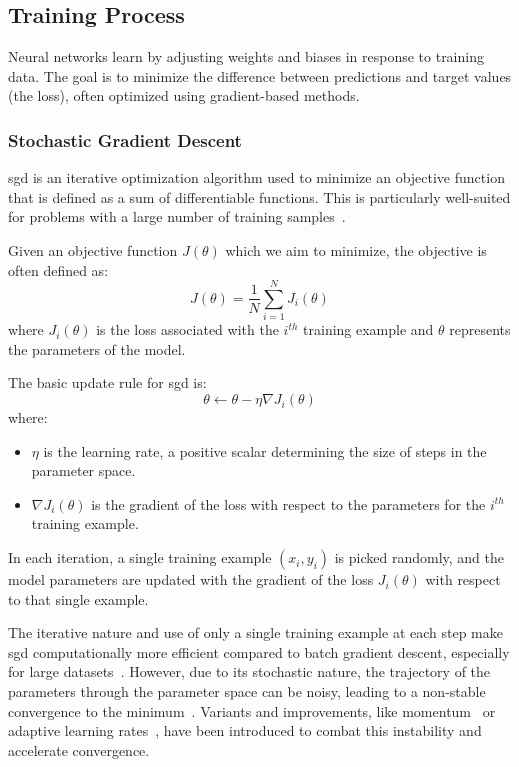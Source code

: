 \subsection{Training Process}

Neural networks learn by adjusting weights and biases in response to training data. The goal is to minimize the difference between predictions and target values (the loss), often optimized using gradient-based methods.

\subsubsection{Stochastic Gradient Descent}

\gls{sgd} is an iterative optimization algorithm used to minimize an objective function that is defined as a sum of differentiable functions. This is particularly well-suited for problems with a large number of training samples~\cite{bottou2010large}.

Given an objective function \( J(\theta) \) which we aim to minimize, the objective is often defined as:
\[
J(\theta) = \frac{1}{N} \sum_{i=1}^{N} J_i(\theta)
\]
where \( J_i(\theta) \) is the loss associated with the \( i^{th} \) training example and \( \theta \) represents the parameters of the model.

The basic update rule for \gls{sgd} is:
\[
\theta \leftarrow \theta - \eta \nabla J_i(\theta)
\]
where:
\begin{itemize}
	\item \( \eta \) is the learning rate, a positive scalar determining the size of steps in the parameter space.
	\item \( \nabla J_i(\theta) \) is the gradient of the loss with respect to the parameters for the \( i^{th} \) training example.
\end{itemize}

In each iteration, a single training example \( (x_i, y_i) \) is picked randomly, and the model parameters are updated with the gradient of the loss \( J_i(\theta) \) with respect to that single example.

The iterative nature and use of only a single training example at each step make \gls{sgd} computationally more efficient compared to batch gradient descent, especially for large datasets~\cite{bottou2010large}. However, due to its stochastic nature, the trajectory of the parameters through the parameter space can be noisy, leading to a non-stable convergence to the minimum~\cite{bottou2018optimization}. Variants and improvements, like momentum~\cite{sutskever2013importance} or adaptive learning rates~\cite{duchi2011adaptive}, have been introduced to combat this instability and accelerate convergence.

